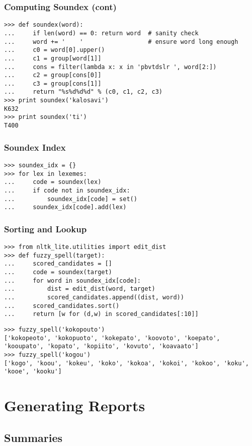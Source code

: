 \documentclass{beamer}
\begin{document}
\begin{frame}[fragile]
\frametitle{Computing Soundex (cont)}
\small

\begin{verbatim}
>>> def soundex(word):
...     if len(word) == 0: return word  # sanity check
...     word += '    '                  # ensure word long enough
...     c0 = word[0].upper()
...     c1 = group[word[1]]
...     cons = filter(lambda x: x in 'pbvtdslr ', word[2:])
...     c2 = group[cons[0]]
...     c3 = group[cons[1]]
...     return "%s%d%d%d" % (c0, c1, c2, c3)
>>> print soundex('kalosavi')
K632
>>> print soundex('ti')
T400
\end{verbatim}
\end{frame}

\begin{frame}[fragile]
\frametitle{Soundex Index}
\begin{verbatim}
>>> soundex_idx = {}
>>> for lex in lexemes:
...     code = soundex(lex)
...     if code not in soundex_idx:
...         soundex_idx[code] = set()
...     soundex_idx[code].add(lex)
\end{verbatim}
\end{frame}

\begin{frame}[fragile]
\frametitle{Sorting and Lookup}
\scriptsize
\begin{verbatim}
>>> from nltk_lite.utilities import edit_dist
>>> def fuzzy_spell(target):
...     scored_candidates = []
...     code = soundex(target)
...     for word in soundex_idx[code]:
...         dist = edit_dist(word, target)
...         scored_candidates.append((dist, word))
...     scored_candidates.sort()
...     return [w for (d,w) in scored_candidates[:10]]
\end{verbatim}

\begin{verbatim}
>>> fuzzy_spell('kokopouto')
['kokopeoto', 'kokopuoto', 'kokepato', 'koovoto', 'koepato', 'kooupato', 'kopato', 'kopiito', 'kovuto', 'koavaato']
>>> fuzzy_spell('kogou')
['kogo', 'koou', 'kokeu', 'koko', 'kokoa', 'kokoi', 'kokoo', 'koku', 'kooe', 'kooku']
\end{verbatim}
\end{frame}

\section{Generating Reports}

\subsection{Summaries}
\end{document}
